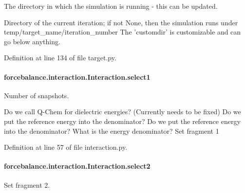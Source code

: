 The directory in which the simulation is running -\/ this can be updated. 

Directory of the current iteration; if not None, then the simulation runs under temp/target\-\_\-name/iteration\-\_\-number The 'customdir' is customizable and can go below anything.

Definition at line 134 of file target.\-py.

\hypertarget{classforcebalance_1_1interaction_1_1Interaction_a22c4a698eb3bf91187894fdce874e8d5}{
\paragraph[{select1}]{\setlength{\rightskip}{0pt plus 5cm}forcebalance.\-interaction.\-Interaction.\-select1\hspace{0.3cm}{\ttfamily [inherited]}}}\label{classforcebalance_1_1interaction_1_1Interaction_a22c4a698eb3bf91187894fdce874e8d5}


Number of snapshots. 

Do we call Q-\/\-Chem for dielectric energies? (Currently needs to be fixed) Do we put the reference energy into the denominator? Do we put the reference energy into the denominator? What is the energy denominator? Set fragment 1 

Definition at line 57 of file interaction.\-py.

\hypertarget{classforcebalance_1_1interaction_1_1Interaction_acbdfffa2596af6c90adf0bfe071d2205}{
\paragraph[{select2}]{\setlength{\rightskip}{0pt plus 5cm}forcebalance.\-interaction.\-Interaction.\-select2\hspace{0.3cm}{\ttfamily [inherited]}}}\label{classforcebalance_1_1interaction_1_1Interaction_acbdfffa2596af6c90adf0bfe071d2205}


Set fragment 2. 




